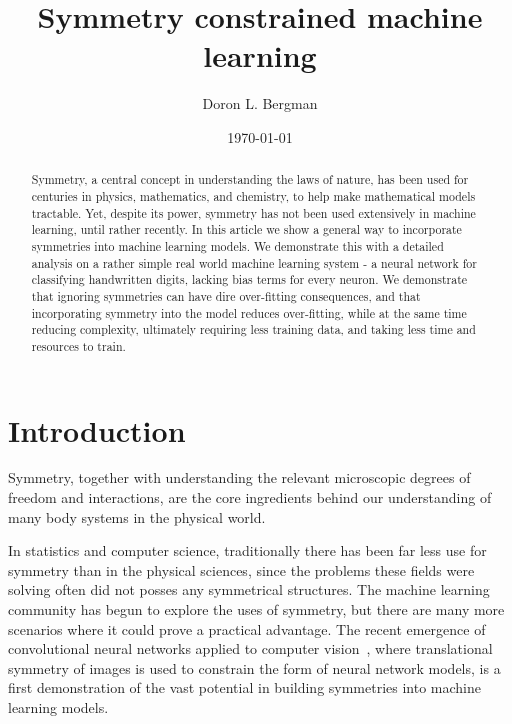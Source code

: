 \documentclass{svproc}
\begin{document}
\newcommand{\be}{\begin{equation}}
\newcommand{\ee}{\end{equation}}


\title{Symmetry constrained machine learning}
\date{\today}

\author{Doron L. Bergman}

\maketitle  

\begin{abstract}%
Symmetry, a central concept in understanding the laws of nature, has been used for centuries in physics, mathematics, and chemistry, to help make mathematical models tractable. Yet, despite its power, symmetry has not been used extensively in machine learning, until rather recently. In this article we show a general way to incorporate symmetries into machine learning models. We demonstrate this with a detailed analysis on a rather simple real world machine learning system - a neural network for classifying handwritten digits, lacking bias terms for every neuron. We demonstrate that ignoring symmetries can have dire over-fitting consequences, and that incorporating symmetry into the model reduces over-fitting, while at the same time reducing complexity, ultimately requiring less training data, and taking less time and resources to train.
\end{abstract}


\section{Introduction}
\label{Sec:Intro}


Symmetry, together with understanding the relevant microscopic degrees of freedom and interactions, are the core ingredients behind our understanding of many body systems in the physical world.


In statistics and computer science, traditionally there has been far less use for symmetry than in the physical sciences,
since the problems these fields were solving often did not posses any symmetrical structures. The machine learning community has begun to explore the uses of symmetry, but there are many more scenarios where it could prove a practical advantage. The recent emergence of convolutional neural networks applied to computer vision~\cite{lecun1989generalization, lecun1999object, lecun1990handwritten, lecun1998gradient, krizhevsky2012imagenet, lee2009convolutional, lecun2015deep}, where translational symmetry of images is used to constrain the form of neural network models, is a first demonstration of the vast potential in building symmetries into machine learning models.
\end{document}
